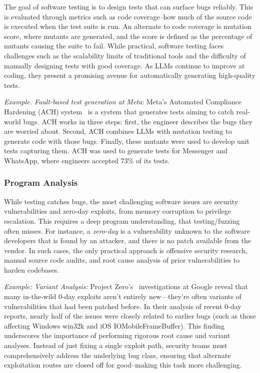 The goal of software testing is to design tests that can surface bugs reliably. This is evaluated through metrics such as code coverage--how much of the source code is executed when the test suite is run. An alternate to code coverage is mutation score, where mutants are generated, and the score is defined as the percentage of mutants causing the suite to fail. While practical, software testing faces challenges such as the scalability limits of traditional tools and the difficulty of manually designing tests with good coverage. As LLMs continue to improve at coding, they present a promising avenue for automatically generating high-quality tests.

\begin{tcolorbox}[colback=lightblue, boxrule=0pt, arc=5pt, outer arc=5pt]
\textit{Example. Fault-based test generation at Meta}: Meta's Automated Compliance Hardening (ACH) system~\citep{foster2025mutation} is a system that generates tests aiming to catch real-world bugs. ACH works in three steps: first, the engineer describes the bugs they are worried about. Second, ACH combines LLMs with mutation testing to generate code with those bugs. Finally, these mutants were used to develop unit tests capturing them. ACH was used to generate tests for Messenger and WhatsApp, where engineers accepted 73\% of its tests.
\end{tcolorbox}

\subsubsection{Program Analysis}

While testing catches bugs, the most challenging software issues are security vulnerabilities and zero-day exploits, from memory corruption to privilege escalation. This requires a deep program understanding, that testing/fuzzing often misses. For instance, a \textit{zero-day} is a vulnerability unknown to the software developers that is found by an attacker, and there is no patch available from the vendor. In such cases, the only practical approach is offensive security research, manual source code audits, and root cause analysis of prior vulnerabilities to harden codebases.

\begin{tcolorbox}[colback=lightblue, boxrule=0pt, arc=5pt, outer arc=5pt]
\textit{Example: Variant Analysis:}
Project Zero’s~\citep{project-zero} investigations at Google reveal that many in-the-wild 0-day exploits aren’t entirely new—they’re often variants of vulnerabilities that had been patched before. In their analysis of recent 0-day reports, nearly half of the issues were closely related to earlier bugs (such as those affecting Windows win32k and iOS IOMobileFrameBuffer). This finding underscores the importance of performing rigorous root cause and variant analyses. Instead of just fixing a single exploit path, security teams must comprehensively address the underlying bug class, ensuring that alternate exploitation routes are closed off for good--making this task more challenging.
\end{tcolorbox}

